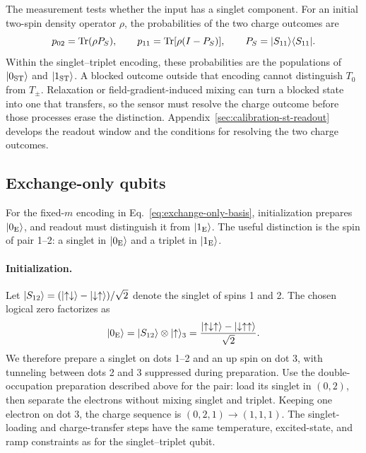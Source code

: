 The measurement tests whether the input has a singlet component.
For an initial two-spin density operator $\rho$, the probabilities
of the two charge outcomes are
\begin{equation}
  p_{02}=\operatorname{Tr}(\rho P_S),\qquad
  p_{11}=\operatorname{Tr}[\rho(I-P_S)],\qquad
  P_S=\ket{S_{11}}\bra{S_{11}}.
  \label{eq:pauli-readout-probabilities}
\end{equation}
Within the singlet--triplet encoding, these probabilities are the
populations of $\lvert 0_{\mathrm{ST}}\rangle$ and $\lvert 1_{\mathrm{ST}}\rangle$.
A blocked outcome outside that encoding cannot distinguish $T_0$
from $T_\pm$. Relaxation or field-gradient-induced mixing can turn
a blocked state into one that transfers, so the sensor must resolve
the charge outcome before those processes erase the distinction.
Appendix~\ref{sec:calibration-st-readout} develops the readout
window and the conditions for resolving the two charge outcomes.


\subsection{Exchange-only qubits}
\label{sec:exchange-only-spam}

For the fixed-$m$ encoding in Eq.~\eqref{eq:exchange-only-basis},
initialization prepares $\lvert 0_{\mathrm E}\rangle$, and readout must
distinguish it from $\lvert 1_{\mathrm E}\rangle$.
The useful distinction is the spin of pair 1--2: a singlet in
$\lvert 0_{\mathrm E}\rangle$ and a triplet in $\lvert 1_{\mathrm E}\rangle$.

\paragraph{Initialization.}
Let $\lvert S_{12}\rangle=(\lvert \uparrow\downarrow\rangle
-\lvert \downarrow\uparrow\rangle)/\sqrt2$ denote the singlet of spins 1 and 2.
The chosen logical zero factorizes as
\begin{equation}
  \ket{0_{\mathrm E}}
    =\ket{S_{12}}\otimes\ket{\uparrow}_3
    =\frac{\ket{\uparrow\downarrow\uparrow}
                  -\ket{\downarrow\uparrow\uparrow}}{\sqrt2}.
  \label{eq:eo-initial-state}
\end{equation}
We therefore prepare a singlet on dots 1--2 and an up spin on dot 3,
with tunneling between dots 2 and 3 suppressed during preparation.
Use the double-occupation preparation described above for the pair:
load its singlet in $(0,2)$, then separate the electrons without
mixing singlet and triplet. Keeping one electron on dot 3, the
charge sequence is $(0,2,1)\to(1,1,1)$.
The singlet-loading and charge-transfer steps have the same
temperature, excited-state, and ramp constraints as for the
singlet--triplet qubit.

